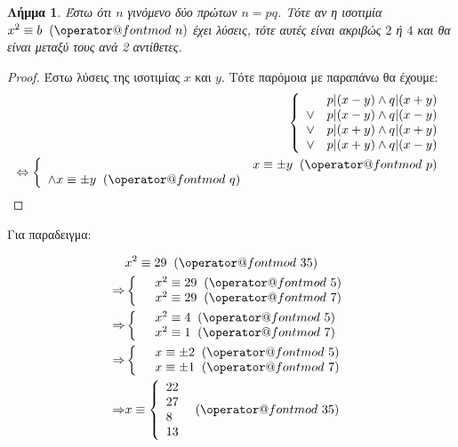 \documentclass[11pt,a4paper]{book}
\makeatletter
\newtheorem*{lemma}{Λήμμα}
\def\imod#1{\allowbreak\mkern10mu({\operator@font mod}\,\,#1)}
\makeatother
\begin{document}
\begin{lemma}
Έστω ότι $n$ γινόμενο δύο πρώτων $n = pq$. Τότε αν η ισοτιμία $x^2 \equiv b \imod n$ έχει λύσεις, τότε αυτές είναι ακριβώς $2$ ή $4$ και θα είναι μεταξύ τους ανά 2 αντίθετες.
\end{lemma}
\begin{proof}
Έστω λύσεις της ισοτιμίας $x$ και $y$. Τότε παρόμοια με παραπάνω θα έχουμε:
\begin{align*}
\left\{\begin{array}{llll}
     & p|(x-y) \land q|(x+y)\\
\lor & p|(x-y) \land q|(x-y)\\
\lor & p|(x+y) \land q|(x+y)\\
\lor & p|(x+y) \land q|(x-y)
\end{array}\right.\\
\Leftrightarrow \left\{\begin{array}{ll}
     & x \equiv \pm y \imod p\\
     \land x \equiv \pm y \imod q
\end{array}\right.
\end{align*}
\end{proof}

Για παραδειγμα:

\begin{align*}
	&x^2 \equiv 29 \imod {35}\\
	\Rightarrow &
	\left\{\begin{array}{ll} & x^2 \equiv 29 \imod 5\\
	& x^2 \equiv 29 \imod 7\end{array}\right.\\
	\Rightarrow &
	\left\{\begin{array}{ll} & x^2 \equiv 4 \imod 5\\
	& x^2 \equiv 1 \imod 7\end{array}\right.\\
	\Rightarrow &
	\left\{\begin{array}{ll} & x \equiv \pm 2 \imod 5\\
	& x \equiv \pm 1 \imod 7\end{array}\right.\\
	\Rightarrow &
	x \equiv \left\{\begin{array}{llll} 22\\27\\8\\13 \end{array}\right. \imod {35}
\end{align*}
\end{document}
